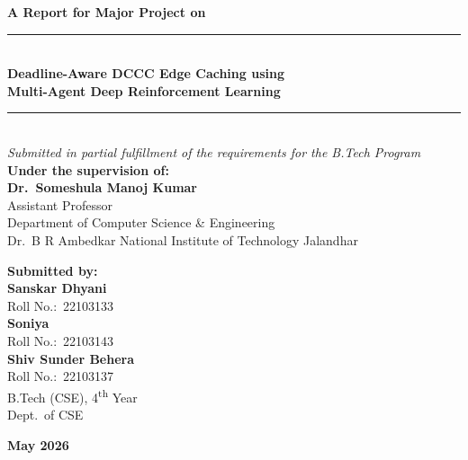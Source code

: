 \documentclass[12pt,a4paper]{report}
\begin{document}


\thispagestyle{empty}
\begin{center}
  \vspace*{0.5cm}
  {\large \textbf{A Report for Major Project on}}\\[0.5cm]
  \rule{\linewidth}{0.5pt}\\[0.3cm]
  {\LARGE \textbf{Deadline-Aware DCCC Edge Caching using\\
  Multi-Agent Deep Reinforcement Learning}}\\[0.3cm]
  \rule{\linewidth}{0.5pt}\\[0.8cm]

  \textit{Submitted in partial fulfillment of the requirements for the B.Tech Program}\\[1.0cm]

  \textbf{Under the supervision of:}\\[0.25cm]
  \textbf{Dr.\ Someshula Manoj Kumar}\\
  Assistant Professor\\
  Department of Computer Science \& Engineering\\
  Dr.\ B R Ambedkar National Institute of Technology Jalandhar\\[1.2cm]

  \begin{minipage}{0.45\textwidth}
    \raggedright
    \textbf{Submitted by:}\\[0.3cm]
    \textbf{Sanskar Dhyani}\\
    Roll No.:\ 22103133\\[0.15cm]
    \textbf{Soniya}\\
    Roll No.:\ 22103143\\[0.15cm]
    \textbf{Shiv Sunder Behera}\\
    Roll No.:\ 22103137\\[0.15cm]
    B.Tech (CSE), 4\textsuperscript{th} Year\\
    Dept.\ of CSE\\
  \end{minipage}
  \hfill
  \begin{minipage}{0.45\textwidth}
    \raggedleft
  \end{minipage}

  \vfill
  {\large \textbf{May 2026}}
\end{center}
\clearpage
\end{document}
